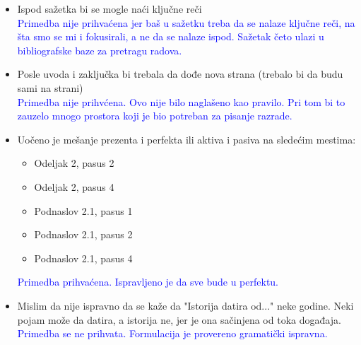 \documentclass[a4paper]{report}
\newcommand{\odgovor}[1]{\textcolor{blue}{#1}}
\begin{document}
\begin{itemize}
    \item Ispod sažetka bi se mogle naći ključne reči
    \\ \odgovor{Primedba nije prihvaćena jer baš u sažetku treba da se nalaze ključne reči, na šta smo se mi i fokusirali, a ne da se nalaze ispod. Sažetak četo ulazi u bibliografske baze za pretragu radova.}
    \item Posle uvoda i zaključka bi trebala da dođe nova strana (trebalo bi da budu sami na strani)
    \\ \odgovor{Primedba nije prihvćena. Ovo nije bilo naglašeno kao pravilo. Pri tom bi to zauzelo mnogo prostora koji je bio potreban za pisanje razrade.}
    \item Uočeno je mešanje prezenta i perfekta ili aktiva i pasiva na sledećim mestima:
    \begin{itemize}
        \item Odeljak 2, pasus 2
        \item Odeljak 2, pasus 4
        \item Podnaslov 2.1, pasus 1
        \item Podnaslov 2.1, pasus 2
        \item Podnaslov 2.1, pasus 4
    \end{itemize}
    \odgovor{Primedba prihvaćena. Ispravljeno je da sve bude u perfektu.}   

    \item Mislim da nije ispravno da se kaže da "Istorija datira od..."  neke godine. Neki pojam može da datira, a istorija ne, jer je ona sačinjena od toka događaja.
    \\ \odgovor{Primedba se ne prihvata. Formulacija je provereno gramatički ispravna.}    


\end{itemize}
\end{document}
